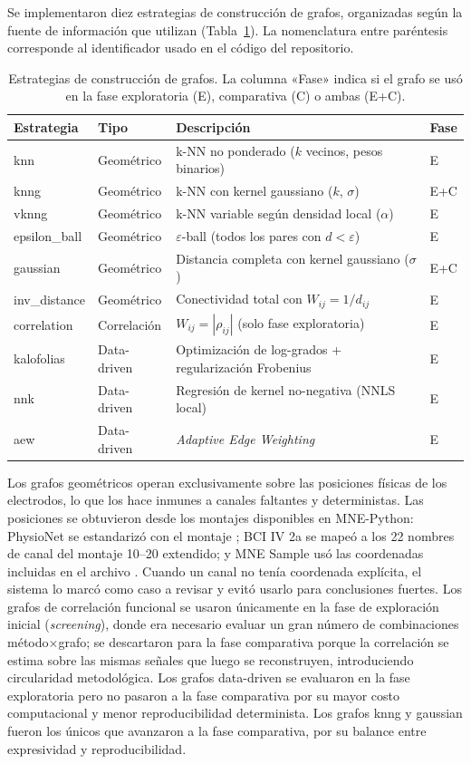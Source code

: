 Se implementaron diez estrategias de construcción de grafos, organizadas según la fuente de información que utilizan (Tabla~\ref{tab:graph_methods}). La nomenclatura entre paréntesis corresponde al identificador usado en el código del repositorio.

\begin{table}[htbp]
\centering
\caption{Estrategias de construcción de grafos. La columna «Fase» indica si el grafo se usó en la fase exploratoria (E), comparativa (C) o ambas (E+C).}
\label{tab:graph_methods}
\small
\begin{tabular}{@{}llp{4.8cm}l@{}}
\toprule
Estrategia & Tipo & Descripción & Fase \\
\midrule
knn & Geométrico & k-NN no ponderado ($k$ vecinos, pesos binarios) & E \\
knng & Geométrico & k-NN con kernel gaussiano ($k$, $\sigma$) & E+C \\
vknng & Geométrico & k-NN variable según densidad local ($\alpha$) & E \\
epsilon\_ball & Geométrico & $\varepsilon$-ball (todos los pares con $d<\varepsilon$) & E \\
gaussian & Geométrico & Distancia completa con kernel gaussiano ($\sigma$) & E+C \\
inv\_distance & Geométrico & Conectividad total con $W_{ij}=1/d_{ij}$ & E \\
correlation & Correlación & $W_{ij}=|\rho_{ij}|$ (solo fase exploratoria) & E \\
kalofolias & Data-driven & Optimización de log-grados + regularización Frobenius & E \\
nnk & Data-driven & Regresión de kernel no-negativa (NNLS local) & E \\
aew & Data-driven & \textit{Adaptive Edge Weighting} & E \\
\bottomrule
\end{tabular}
\end{table}

Los grafos geométricos operan exclusivamente sobre las posiciones físicas de los electrodos, lo que los hace inmunes a canales faltantes y deterministas. Las posiciones se obtuvieron desde los montajes disponibles en MNE-Python: PhysioNet se estandarizó con el montaje ; BCI IV 2a se mapeó a los 22 nombres de canal del montaje 10--20 extendido; y MNE Sample usó las coordenadas incluidas en el archivo . Cuando un canal no tenía coordenada explícita, el sistema lo marcó como caso a revisar y evitó usarlo para conclusiones fuertes. Los grafos de correlación funcional se usaron únicamente en la fase de exploración inicial (\textit{screening}), donde era necesario evaluar un gran número de combinaciones método$\times$grafo; se descartaron para la fase comparativa porque la correlación se estima sobre las mismas señales que luego se reconstruyen, introduciendo circularidad metodológica. Los grafos data-driven se evaluaron en la fase exploratoria pero no pasaron a la fase comparativa por su mayor costo computacional y menor reproducibilidad determinista. Los grafos knng y gaussian fueron los únicos que avanzaron a la fase comparativa, por su balance entre expresividad y reproducibilidad.

